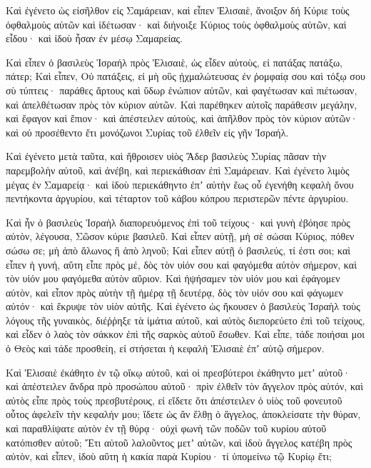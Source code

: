 {Καὶ ἐγένετο ὡς εἰσῆλθον εἰς Σαμάρειαν, καὶ εἶπεν Ἑλισαιὲ, ἄνοιξον δή Κύριε τοὺς ὀφθαλμοὺς αὐτῶν καὶ ἰδέτωσαν· καὶ διήνοιξε Κύριος τοὺς ὀφθαλμοὺς αὐτῶν, καὶ εἶδου· καὶ ἰδοὺ ἦσαν ἐν μέσῳ Σαμαρείας.
\par }{\PP {}Καὶ εἶπεν ὁ βασιλεὺς Ἰσραήλ πρὸς Ἑλισαιὲ, ὡς εἶδεν αὐτοὺς, εἰ πατάξας πατάξω, πάτερ;
Καὶ εἶπεν, Οὐ πατάξεις, εἰ μὴ οὓς ᾐχμαλώτευσας ἐν ῥομφαίᾳ σου καὶ τόξῳ σου σὺ τύπτεις· παράθες ἄρτους καὶ ὕδωρ ἐνώπιον αὐτῶν, καὶ φαγέτωσαν καὶ πιέτωσαν, καὶ ἀπελθέτωσαν πρὸς τὸν κύριον αὐτῶν.
Καὶ παρέθηκεν αὐτοῖς παράθεσιν μεγάλην, καὶ ἔφαγον καὶ ἔπιον· καὶ ἀπέστειλεν αὐτοὺς, καὶ ἀπῆλθον πρὸς τὸν κύριον αὐτῶν· καὶ οὐ προσέθεντο ἔτι μονόζωνοι Συρίας τοῦ ἐλθεῖν εἰς γῆν Ἰσραήλ.
\par }{\PP {}Καὶ ἐγένετο μετὰ ταῦτα, καὶ ἤθροισεν υἱὸς Ἅδερ βασιλεὺς Συρίας πᾶσαν τὴν παρεμβολὴν αὐτοῦ, καὶ ἀνέβη, καὶ περιεκάθισαν ἐπὶ Σαμάρειαν.
Καὶ ἐγένετο λιμὸς μέγας ἐν Σαμαρείᾳ· καὶ ἰδοὺ περιεκάθηντο ἐπʼ αὐτὴν ἕως οὗ ἐγενήθη κεφαλὴ ὄνου πεντήκοντα ἀργυρίου, καὶ τέταρτον τοῦ κάβου κόπρου περιστερῶν πέντε ἀργυρίου.
\par }{\PP {}Καὶ ἦν ὁ βασιλεὺς Ἰσραὴλ διαπορευόμενος ἐπὶ τοῦ τείχους· καὶ γυνὴ ἐβόησε πρὸς αὐτὸν, λέγουσα, Σῶσον κύριε βασιλεῦ.
Καὶ εἶπεν αὐτῇ, μὴ σὲ σώσαι Κύριος, πόθεν σώσω σε; μὴ ἀπὸ ἅλωνος ἢ ἀπὸ ληνοῦ;
Καὶ εἶπεν αὐτῇ ὁ βασιλεύς, τί ἐστι σοι; καὶ εἶπεν ἡ γυνή, αὕτη εἶπε πρὸς μέ, δὸς τὸν υἱόν σου καὶ φαγόμεθα αὐτὸν σήμερον, καὶ τὸν υἱόν μου φαγόμεθα αὐτὸν αὔριον.
Καὶ ἡψήσαμεν τὸν υἱόν μου καὶ ἐφάγομεν αὐτὸν, καὶ εἶπον πρὸς αὐτὴν τῇ ἡμέρᾳ τῇ δευτέρᾳ, δὸς τὸν υἱόν σου καὶ φάγωμεν αὐτόν· καὶ ἔκρυψε τὸν υἱὸν αὐτῆς.
Καὶ ἐγένετο ὡς ἤκουσεν ὁ βασιλεὺς Ἰσραὴλ τοὺς λόγους τῆς γυναικὸς, διέῤῥηξε τὰ ἱμάτια αὐτοῦ, καὶ αὐτὸς διεπορεύετο ἐπὶ τοῦ τείχους, καὶ εἶδεν ὁ λαὸς τὸν σάκκον ἐπὶ τῆς σαρκὸς αὑτοῦ ἔσωθεν.
Καὶ εἶπε, τάδε ποιήσαι μοι ὁ Θεὸς καὶ τάδε προσθείη, εἰ στήσεται ἡ κεφαλὴ Ἑλισαιὲ ἐπʼ αὐτῷ σήμερον.
\par }{\PP {}Καὶ Ἑλισαιὲ ἐκάθητο ἐν τῷ οἴκῳ αὐτοῦ, καὶ οἱ πρεσβύτεροι ἐκάθηντο μετʼ αὐτοῦ· καὶ ἀπέστειλεν ἄνδρα πρὸ προσώπου αὐτοῦ· πρὶν ἐλθεῖν τὸν ἄγγελον πρὸς αὐτόν, καὶ αὐτὸς εἶπε πρὸς τοὺς πρεσβυτέρους, εἰ εἴδετε ὅτι ἀπέστειλεν ὁ υἱὸς τοῦ φονευτοῦ οὗτος ἀφελεῖν τὴν κεφαλήν μου; ἴδετε ὡς ἂν ἔλθῃ ὁ ἄγγελος, ἀποκλείσατε τὴν θύραν, καὶ παραθλίψατε αὐτὸν ἐν τῇ θύρᾳ· οὐχὶ φωνὴ τῶν ποδῶν τοῦ κυρίου αὐτοῦ κατόπισθεν αὐτοῦ;
Ἔτι αὐτοῦ λαλοῦντος μετʼ αὐτῶν, καὶ ἰδοὺ ἄγγελος κατέβη πρὸς αὐτὸν, καὶ εἶπεν, ἰδοὺ αὕτη ἡ κακία παρὰ Κυρίου· τί ὑπομείνω τῷ Κυρίῳ ἔτι;

}
